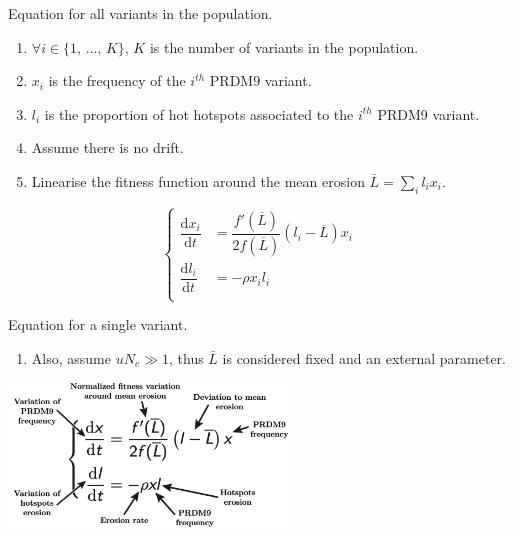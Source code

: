 \documentclass[10pt]{beamer}
\begin{document}
\begin{frame}
	\begin{center}
		\Large
    	Equation for all variants in the population.
	\end{center}
	\begin{enumerate}
	\item $\forall i \in \{ 1, \, \dots, \, K \} $, $K$ is the number of variants in the population.
		
	\item $x_i$ is the frequency of the $i^{th}$ PRDM9 variant.\\
	
	\item $l_i$ is the proportion of hot hotspots associated to the $i^{th}$ PRDM9 variant.\\
		
	\item Assume there is no drift. 
	
	\item Linearise the fitness function around the mean erosion $\bar{L} = \sum_i l_i x_i$.
	\end{enumerate}
\[
  \left\{
      \begin{aligned}
          \dfrac{\mathrm{d}x_i}{\mathrm{d}t} &= \dfrac{f'(\overline{L})}{2 f(\overline{L})} \left( l_i - \overline{L} \right) x_i \\
        \dfrac{\mathrm{d}l_i}{\mathrm{d}t} &= 
        - \rho x_i l_i \\
      \end{aligned}
    \right.
\]
\end{frame}

\begin{frame}
	\begin{center}
		\Large
    	Equation for a single variant.
	\end{center}
	\begin{enumerate}
		\item Also, assume $ u N_e \gg 1$, thus $\bar{L}$ is considered fixed and an external parameter.
	\end{enumerate}
	\begin{center}
       \includegraphics[width=7.5cm]{Images/equation.png}
	\end{center}
\end{frame}
\end{document}
